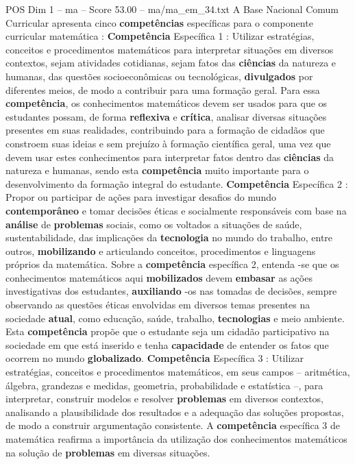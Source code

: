 \begin{textsample}{POS Dim 1 – ma – Score 53.00 – ma/ma\_em\_34.txt}
A Base Nacional Comum Curricular apresenta cinco \textbf{competências} específicas para o componente curricular matemática : \textbf{Competência} Específica 1 : Utilizar estratégias, conceitos e procedimentos matemáticos para interpretar situações em diversos contextos, sejam atividades cotidianas, sejam fatos das \textbf{ciências} da natureza e humanas, das questões socioeconômicas ou tecnológicas, \textbf{divulgados} por diferentes meios, de modo a contribuir para uma formação geral.
Para essa \textbf{competência}, os conhecimentos matemáticos devem ser usados para que os estudantes possam, de forma \textbf{reflexiva} e \textbf{crítica}, analisar diversas situações presentes em suas realidades, contribuindo para a formação de cidadãos que constroem suas ideias e sem prejuízo à formação científica geral, uma vez que devem usar estes conhecimentos para interpretar fatos dentro das \textbf{ciências} da natureza e humanas, sendo esta \textbf{competência} muito importante para o desenvolvimento da formação integral do estudante. \textbf{Competência} Específica 2 : Propor ou participar de ações para investigar desafios do mundo \textbf{contemporâneo} e tomar decisões éticas e socialmente responsáveis com base na \textbf{análise} de \textbf{problemas} sociais, como os voltados a situações de saúde, sustentabilidade, das implicações da \textbf{tecnologia} no mundo do trabalho, entre outros, \textbf{mobilizando} e articulando conceitos, procedimentos e linguagens próprios da matemática.
Sobre a \textbf{competência} específica 2, entenda -se que os conhecimentos matemáticos aqui \textbf{mobilizados} devem \textbf{embasar} as ações investigativas dos estudantes, \textbf{auxiliando} -os nas tomadas de decisões, sempre observando as questões éticas envolvidas em diversos temas presentes na sociedade \textbf{atual}, como educação, saúde, trabalho, \textbf{tecnologias} e meio ambiente.
Esta \textbf{competência} propõe que o estudante seja um cidadão participativo na sociedade em que está inserido e tenha \textbf{capacidade} de entender os fatos que ocorrem no mundo \textbf{globalizado}. \textbf{Competência} Específica 3 : Utilizar estratégias, conceitos e procedimentos matemáticos, em seus campos – aritmética, álgebra, grandezas e medidas, geometria, probabilidade e estatística –, para interpretar, construir modelos e resolver \textbf{problemas} em diversos contextos, analisando a plausibilidade dos resultados e a adequação das soluções propostas, de modo a construir argumentação consistente.
A \textbf{competência} específica 3 de matemática reafirma a importância da utilização dos conhecimentos matemáticos na solução de \textbf{problemas} em diversas situações.

\end{textsample}
